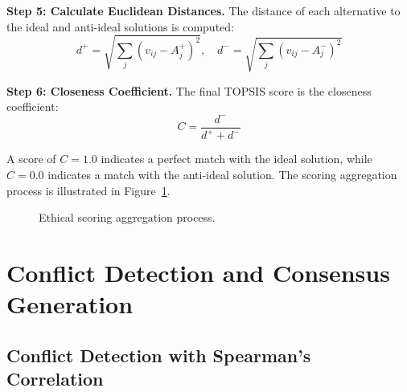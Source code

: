 \textbf{Step 5: Calculate Euclidean Distances.} The distance of each alternative to the ideal and anti-ideal solutions is computed:
\begin{equation}
  d^+ = \sqrt{\sum_{j} (v_{ij} - A^+_j)^2}, \quad d^- = \sqrt{\sum_{j} (v_{ij} - A^-_j)^2}
  \label{eq:distances}
\end{equation}

\textbf{Step 6: Closeness Coefficient.} The final TOPSIS score is the closeness coefficient:
\begin{equation}
  C = \frac{d^-}{d^+ + d^-}
  \label{eq:closeness}
\end{equation}

A score of $C = 1.0$ indicates a perfect match with the ideal solution, while $C = 0.0$ indicates a match with the anti-ideal solution. The scoring aggregation process is illustrated in Figure~\ref{fig:scoring_flow}.

\begin{figure}[H]
\centering
{}
\caption{Ethical scoring aggregation process.}
\label{fig:scoring_flow}
\end{figure}

\section{Conflict Detection and Consensus Generation}
\label{sec:conflict}

\subsection{Conflict Detection with Spearman's Correlation}
\label{sec:spearman}

